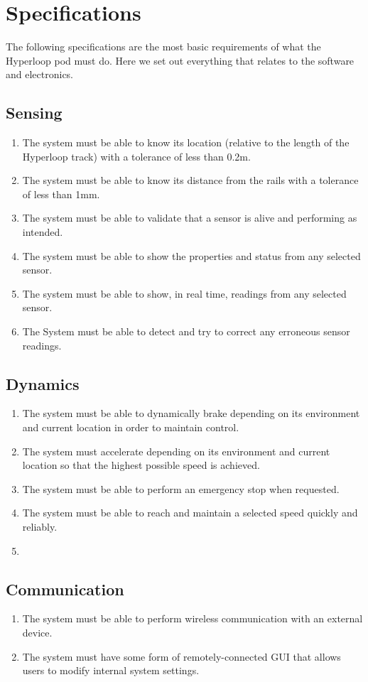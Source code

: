 \section{Specifications}
The following specifications are the most basic requirements of what the Hyperloop pod must do. Here we set out everything that relates to the software and electronics.


\subsection{Sensing}
\begin{enumerate}
    \item The system must be able to know its location (relative to the length of the Hyperloop track) with a tolerance of less than 0.2m.
    \item The system must be able to know its distance from the rails with a tolerance of less than 1mm.
    \item The system must be able to validate that a sensor is alive and performing as intended.
    \item The system must be able to show the properties and status from any selected sensor.
    \item The system must be able to show, in real time, readings from any selected sensor.
    \item The System must be able to detect and try to correct any erroneous sensor readings.
\end{enumerate}

\subsection{Dynamics}
\begin{enumerate}
    \item The system must be able to dynamically brake depending on its environment and current location in order to maintain control.
    \item The system must accelerate depending on its environment and current location so that the highest possible speed is achieved.
    \item The system must be able to perform an emergency stop when requested.
    \item The system must be able to reach and maintain a selected speed quickly and reliably.
    \item 
\end{enumerate}

\subsection{Communication}
\begin{enumerate}
    \item The system must be able to perform wireless communication with an external device.
    \item The system must have some form of remotely-connected GUI that allows users to modify internal system settings.
\end{enumerate}


